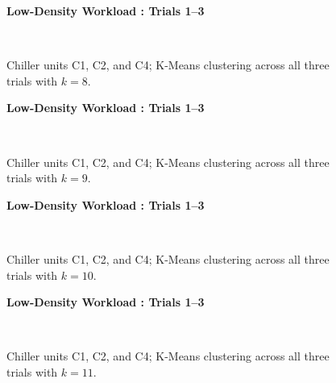 \begin{figure}[!h]
\centerline{\bfseries\large Low-Density Workload : Trials 1--3}\\
\caption{Chiller units C1, C2, and C4; K-Means clustering across all three trials with $k=8$.}
\end{figure}
\begin{figure}[!h]
\centerline{\bfseries\large Low-Density Workload : Trials 1--3}\\
\caption{Chiller units C1, C2, and C4; K-Means clustering across all three trials with $k=9$.}
\end{figure}
\begin{figure}[!h]
\centerline{\bfseries\large Low-Density Workload : Trials 1--3}\\
\caption{Chiller units C1, C2, and C4; K-Means clustering across all three trials with $k=10$.}
\end{figure}
\begin{figure}[!h]
\centerline{\bfseries\large Low-Density Workload : Trials 1--3}\\
\caption{Chiller units C1, C2, and C4; K-Means clustering across all three trials with $k=11$.}
\end{figure}
